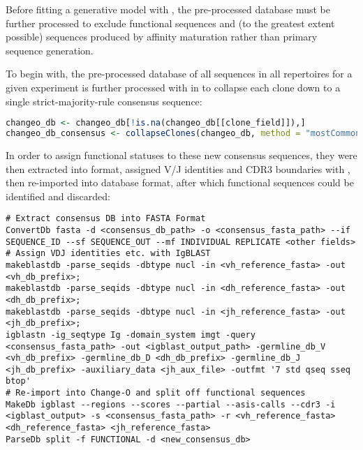
Before fitting a generative model with , the pre-processed  database must be further processed to exclude functional sequences and (to the greatest extent possible) sequences produced by affinity maturation rather than primary sequence generation.

To begin with, the pre-processed  database of all sequences in all repertoires for a given experiment is further processed with  \parencite{gupta2015changeo} in  to collapse each clone down to a single strict-majority-rule consensus sequence:

\begin{lstlisting}[language=R]
changeo_db <- changeo_db[!is.na(changeo_db[[clone_field]]),]
changeo_db_consensus <- collapseClones(changeo_db, method = "mostCommon")
\end{lstlisting}

\noindent In order to assign functional statuses to these new consensus sequences, they were then extracted into  format, assigned V/J identities and CDR3 boundaries with , then re-imported into  database format, after which functional sequences could be identified and discarded:

\begin{lstlisting}
# Extract consensus DB into FASTA Format
ConvertDb fasta -d <consensus_db_path> -o <consensus_fasta_path> --if SEQUENCE_ID --sf SEQUENCE_OUT --mf INDIVIDUAL REPLICATE <other fields> 
# Assign VDJ identities etc. with IgBLAST
makeblastdb -parse_seqids -dbtype nucl -in <vh_reference_fasta> -out <vh_db_prefix>;
makeblastdb -parse_seqids -dbtype nucl -in <dh_reference_fasta> -out <dh_db_prefix>;
makeblastdb -parse_seqids -dbtype nucl -in <jh_reference_fasta> -out <jh_db_prefix>;
igblastn -ig_seqtype Ig -domain_system imgt -query <consensus_fasta_path> -out <igblast_output_path> -germline_db_V <vh_db_prefix> -germline_db_D <dh_db_prefix> -germline_db_J <jh_db_prefix> -auxiliary_data <jh_aux_file> -outfmt '7 std qseq sseq btop'
# Re-import into Change-O and split off functional sequences
MakeDb igblast --regions --scores --partial --asis-calls --cdr3 -i <igblast_output> -s <consensus_fasta_path> -r <vh_reference_fasta> <dh_reference_fasta> <jh_reference_fasta>
ParseDb split -f FUNCTIONAL -d <new_consensus_db>
\end{lstlisting}


